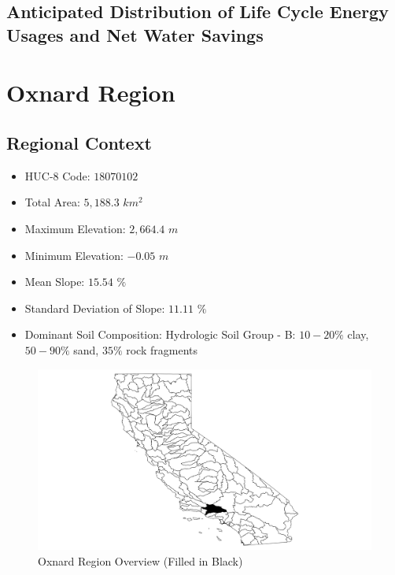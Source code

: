     \subsection{Anticipated Distribution of Life Cycle Energy Usages and Net Water Savings}
    
\section{Oxnard Region}

    \subsection{Regional Context}
    
    \begin{itemize}
      \setlength{\itemsep}{0cm}
      \setlength{\parskip}{0cm}
        \item HUC-8 Code: $18070102$
        \item Total Area: $5,188.3$ $km^2$
        \item Maximum Elevation: $2,664.4$ $m$
        \item Minimum Elevation: $-0.05$ $m$
        \item Mean Slope: $15.54$ $\%$
        \item Standard Deviation of Slope: $11.11$ $\%$
        \item Dominant Soil Composition: Hydrologic Soil Group - B: $10-20\%$ clay, $50-90\%$ sand, $35\%$ rock fragments
    \end{itemize}
    
        \begin{figure}[!h]
            \begin{center}
            \includegraphics[width=5.5in]{figures/Oxnard_Overview.png}   
            \caption{Oxnard Region Overview (Filled in Black)}
            \label{fig:Ooverview}
            \end{center}
        \end{figure}

